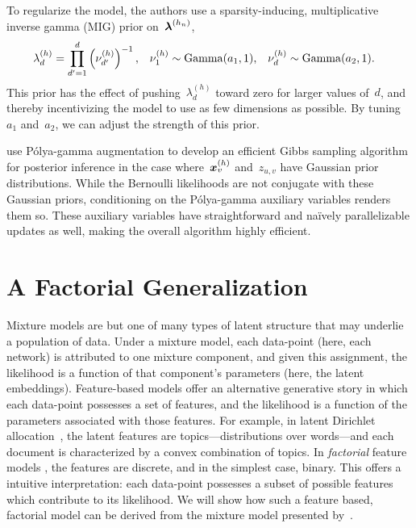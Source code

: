 To regularize the model, the authors use a sparsity-inducing, multiplicative
inverse gamma (MIG) prior on~$\boldsymbol{\lambda}^{(h_n)}$,
\begin{align}
  \lambda_d^{(h)} &= \prod_{d'=1}^d \left(\nu_{d'}^{(h)} \right)^{-1}, &
  \nu_1^{(h)} &\sim \mathrm{Gamma}(a_1, 1), &
  \nu_d^{(h)} &\sim \mathrm{Gamma}(a_2, 1).
\end{align}
This prior has the effect of pushing~$\lambda_d^{(h)}$ toward zero
for larger values of~$d$, and thereby incentivizing the model to use
as few dimensions as possible. By tuning~$a_1$ and~$a_2$, we can adjust
the strength of this prior.

\citet{durante2016nonparametric} use
P\'{o}lya-gamma augmentation to develop an
efficient Gibbs sampling algorithm for posterior inference in the case
where~$\boldsymbol{x}_v^{(h)}$ and~$z_{u,v}$ have Gaussian prior distributions. 
While the Bernoulli likelihoods are not conjugate with these Gaussian
priors, conditioning on the P\'{o}lya-gamma auxiliary variables renders them so.
These auxiliary variables have straightforward and na\"{i}vely parallelizable
updates as well, making the overall algorithm highly efficient.

\section{A Factorial Generalization}
Mixture models are but one of many types of latent structure that may
underlie a population of data.  Under a mixture model, each data-point
(here, each network) is attributed to one mixture component, and given
this assignment, the likelihood is a function of that component's
parameters (here, the latent embeddings).  Feature-based models offer
an alternative generative story in which each data-point possesses a
set of features, and the likelihood is a function of the parameters
associated with those features.  For example, in latent Dirichlet
allocation~\citep{blei2003latent}, the latent features are
topics---distributions over words---and each document is characterized
by a convex combination of topics.  In \emph{factorial} feature models
\citep{ghahramani1995factorial, ghahramani1996factorial,
  meeds2007modeling, ghahramani2007bayesian}, the features are
discrete, and in the simplest case, binary.  This offers a intuitive
interpretation: each data-point possesses a subset of possible features
which contribute to its likelihood.  We will show how such a feature
based, factorial model can be derived from the mixture model presented
by~\citep{durante2016nonparametric}.

